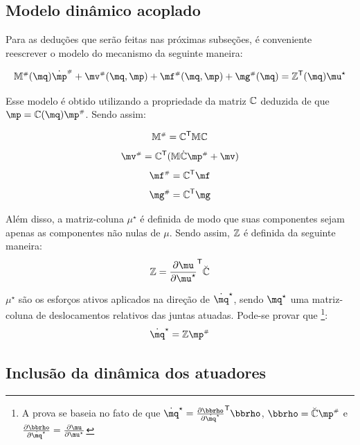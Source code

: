 \documentclass[a4paper,11pt,brazil,fleqn]{article}
\begin{document}
\subsection{Modelo din\^amico acoplado}\label{S04-3}

Para as dedu\c{c}\~oes que ser\~ao feitas nas pr\'oximas subse\c{c}\~oes, \'e conveniente reescrever o modelo do mecanismo da seguinte maneira:

\begin{equation} \label{eq:ModeloAcoplado}
\mM\ssh(\mq) \dot{\mp}\ssh + \mv\ssh(\mq,\mp) + \mf\ssh(\mq,\mp) + \mg\ssh(\mq) = \mZ^\msT (\mq) \mu^\star
\end{equation}

Esse modelo \'e obtido utilizando a propriedade da matriz $\mathbb{C}$ deduzida de que $\mp = \mC(\mq) \mp\ssh$. Sendo assim:

\begin{equation}
\mathbb{M}^{\scriptscriptstyle \#} = \mathbb{C}^{\mathsf{T}} \mathbb{M} \mathbb{C}
\end{equation}
\begin{equation}
\mv\ssh = \mC^\msT ( \mM \dot{\mC} \mp\ssh + \mv )
\end{equation}
\begin{equation}
\mf\ssh = \mC^\msT \mf
\end{equation}
\begin{equation}
\mg\ssh = \mC^\msT \mg
\end{equation}

Al\'em disso, a matriz-coluna $\mu^\star$ \'e definida de modo que suas componentes sejam apenas as componentes n\~ao nulas de $\mu$. Sendo assim, $\mathbb{Z}$ \'e definida da seguinte maneira:
\begin{equation}
\mZ = \displaystyle\frac{\partial \mu}{\partial \mu^\star}^\msT \breve{\mC}
\end{equation}

$\mu^\star$ s\~ao os esfor\c{c}os ativos aplicados na dire\c{c}\~ao de $\dot{\mq}^\star$, sendo $\mq^\star$ uma matriz-coluna de deslocamentos relativos das juntas atuadas. Pode-se provar que \footnote{A prova se baseia no fato de que $\dot{\mq}^\star = \frac{\partial \mrho}{\partial \dot{\mq}^\star}^\msT \mrho$, $\mrho = \breve{\mC} \mp\ssh$ e $\frac{\partial \mrho}{\partial \dot{\mq}^\star} = \frac{\partial \mu}{\partial \mu^\star} $}:
\begin{equation} \label{eq:qstar}
\dot{\mq}^\star =  \mZ \mp\ssh
\end{equation}

\subsection{Inclus\~ao da din\^amica dos atuadores}\label{S04-4}
\end{document}
